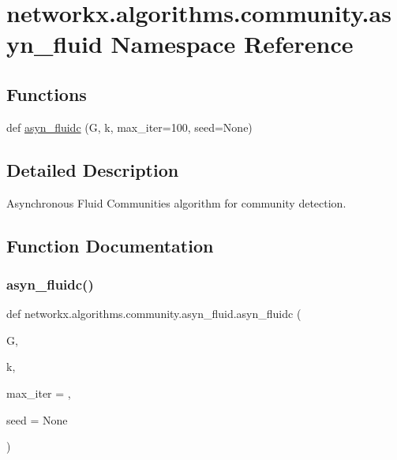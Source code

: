 \hypertarget{namespacenetworkx_1_1algorithms_1_1community_1_1asyn__fluid}{}\section{networkx.\+algorithms.\+community.\+asyn\+\_\+fluid Namespace Reference}
\label{namespacenetworkx_1_1algorithms_1_1community_1_1asyn__fluid}
\subsection*{Functions}
\begin{DoxyCompactItemize}
\item 
def \hyperlink{namespacenetworkx_1_1algorithms_1_1community_1_1asyn__fluid_ac6ef844e9d6118db83ffc421e6b549c4}{asyn\+\_\+fluidc} (G, k, max\+\_\+iter=100, seed=None)
\end{DoxyCompactItemize}


\subsection{Detailed Description}
\begin{DoxyVerb}Asynchronous Fluid Communities algorithm for community detection.\end{DoxyVerb}
 

\subsection{Function Documentation}
\mbox{\label{namespacenetworkx_1_1algorithms_1_1community_1_1asyn__fluid_ac6ef844e9d6118db83ffc421e6b549c4}} 
\subsubsection{\texorpdfstring{asyn\+\_\+fluidc()}{asyn\_fluidc()}}
{\footnotesize\ttfamily def networkx.\+algorithms.\+community.\+asyn\+\_\+fluid.\+asyn\+\_\+fluidc (\begin{DoxyParamCaption}\item[{}]{G,  }\item[{}]{k,  }\item[{}]{max\+\_\+iter = {},  }\item[{}]{seed = {\ttfamily None} }\end{DoxyParamCaption})}

